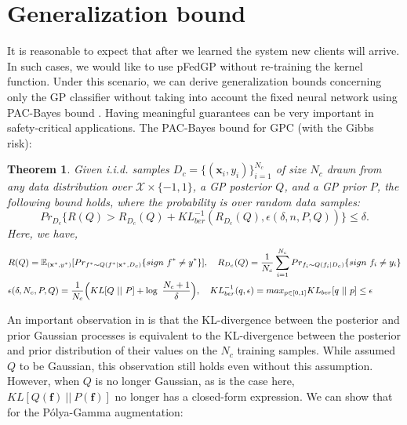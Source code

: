 \documentclass{article}
\def\rvf{{\mathbf{f}}}
\def\rvx{{\mathbf{x}}}
\newcommand{\E}{\mathbb{E}}
\newcommand{\KL}{KL}
\newtheorem{theorem}{Theorem}
\newcommand{\pg}{P\'olya-Gamma }
\begin{document}
\section{Generalization bound} \label{sec:analysis}
It is reasonable to expect that after we learned the system new clients will arrive. In such cases, we would like to use pFedGP without re-training the kernel function. Under this scenario, we can derive generalization bounds concerning only the GP classifier without taking into account the fixed neural network using PAC-Bayes bound \cite{mcallester2003pac}. Having meaningful guarantees can be very important in safety-critical applications. The PAC-Bayes bound for GPC \cite{seeger2002pac}  (with the Gibbs risk):


\begin{theorem}
Given i.i.d. samples $D_c = \{(\rvx_i, y_i)\}_{i=1}^{N_c}$ of size $N_c$ drawn from any data distribution over $\mathcal{X} \times \{-1, 1\}$, a GP posterior $Q$, and a GP prior $P$, the following bound holds, where the probability is over random data samples:
\begin{equation}\label{eq:theorm_gp_pac_bayes}
    Pr_{D_c}\{R(Q) > R_{D_c}(Q) +\KL_{ber}^{-1}(R_{D_c}(Q), \epsilon(\delta, n, P, Q))\} \leq \delta.
\end{equation}
Here, we have,
\begin{equation}
    \small
    \begin{aligned}
    &R(Q) = \E_{(\rvx^*, y^*)}[Pr_{f^* \sim Q(f^* | \rvx^*, D_c)} \{sign~f^* \neq y^*\}],\quad 
    R_{D_c}(Q) = \frac{1}{{N_c}}\sum_{i=1}^{N_c} Pr_{f_i \sim Q(f_i | D_c)} \{sign~f_i \neq y_i\} \\
    &\epsilon(\delta, {N_c}, P, Q) = \frac{1}{{N_c}} \Big(\KL[Q~||~P] + \log~\frac{{N_c}+1}{\delta}\Big),\quad
     \KL^{-1}_{ber}(q, \epsilon) = max_{p \in [0, 1]} \KL_{ber}[q~||~p] \leq \epsilon
    \end{aligned}
\end{equation}
\end{theorem}

An important observation in \cite{seeger2002pac} is that the KL-divergence between the posterior and prior Gaussian processes is equivalent to the KL-divergence between the posterior and prior distribution of their values on the $N_c$ training samples. While \cite{seeger2002pac} assumed $Q$ to be Gaussian, this observation still holds even without this assumption. However, when $Q$ is no longer Gaussian, as is the case here, $\KL[Q(\rvf)~||~P(\rvf)]$ no longer has a closed-form expression. We can show that for the \pg augmentation:
\end{document}
